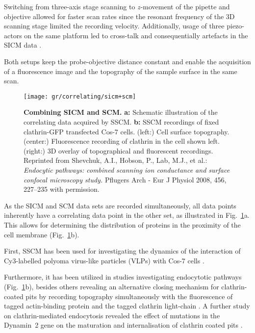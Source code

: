 Switching from three-axis stage scanning to $z$-movement of the pipette and
objective allowed for faster scan rates since the resonant frequency of the 3D
scanning stage limited the recording velocity. Additionally, usage of three
piezo-actors on the same platform led to cross-talk and consequentially
artefacts in the SICM data \cite{Shevchuk2013}.


Both setups keep the probe-objective distance constant and enable the
acquisition of a fluorescence image and the topography of the sample surface in
the same scan.

\begin{figure}
  \texttt{[image: gr/correlating/sicm+scm]}
  \caption{%
    \textbf{Combining SICM and SCM.}
    \textbf{a:} Schematic illustration of the correlating data acquired by SSCM.
    \textbf{b:} SSCM recordings of fixed clathrin-GFP transfected Cos-7 cells. 
    	(left:) Cell surface topography. 
    	(center:) Fluorescence recording of clathrin in the cell shown left. 
    	(right:) 3D overlay of topographical and fluorescent recordings. 
    Reprinted from Shevchuk, A.I., Hobson, P., Lab, M.J., et al.: \emph{Endocytic
    pathways: combined scanning ion conductance and surface confocal
    microscopy study.} Pflugers Arch - Eur J Physiol 2008, 456, 227–235 with permission.
  }
  \label{fig:sicm+scm}
\end{figure}

As the SICM and SCM data sets are recorded simultaneously, all data points
inherently have a correlating data point in the other set, as illustrated in
Fig.~\ref{fig:sicm+scm}a. This allows for determining the distribution of
proteins in the proximity of the cell membrane (Fig.~\ref{fig:sicm+scm}b).



First, SSCM has been used for investigating the dynamics of the interaction of
Cy3-labelled polyoma virus-like particles (VLPs) with Cos-7 cells
\cite{Gorelik2002a}.

Furthermore, it has been utilized in studies investigating endocytotic
pathways \cite{Shevchuk2008a} (Fig.~\ref{fig:sicm+scm}b), besides others
revealing an alternative closing mechanism for clathrin-coated pits by
recording topography simultaneously with the fluorescence of tagged
actin-binding protein and the tagged clathrin light-chain
\cite{Shevchuk2012}. A further study on clathrin-mediated endocytosis revealed
the effect of mutations in the Dynamin~2 gene on the maturation and
internalisation of clathrin coated pits \cite{Ali2019}.

